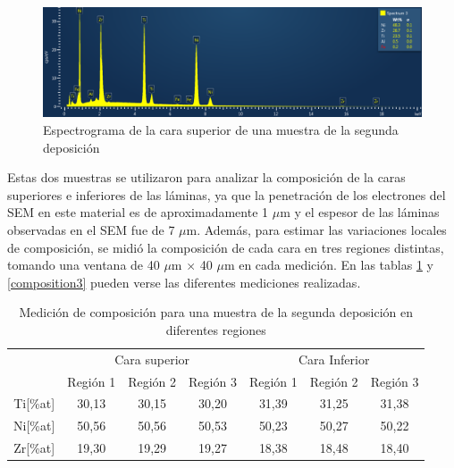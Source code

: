 \documentclass[12pt]{article}
\theoremstyle{definition}
\theoremstyle{remark}
\begin{document}
{ \begin{figure}[H]
 	\centering
	\includegraphics[scale=0.5]{img/dep2.png}
 	\caption{Espectrograma de la cara superior de una muestra de la segunda deposición}
	\label{dep2}
\end{figure} 

Estas dos muestras se utilizaron para analizar la composición de la caras superiores e inferiores de las láminas, ya que la penetración de los electrones del SEM en este material es de aproximadamente 1 $\mu$m y el espesor de las láminas observadas en el SEM fue de 7 $\mu$m. Además, para estimar las variaciones locales de composición, se midió la composición de cada cara en tres regiones distintas, tomando una ventana de 40 $\mu$m $\times$ 40 $\mu$m en cada medición. En las tablas \ref{composition2} y \ref{composition3} pueden verse las diferentes mediciones realizadas.


\begin{table}[H]
\begin{tabular}{c|c|c|c|c|c|c|}
\cline{2-7}
\multicolumn{1}{l|}{} & \multicolumn{3}{c|}{Cara superior} & \multicolumn{3}{c|}{Cara Inferior} \\ \cline{2-7} 
\multicolumn{1}{l|}{} & Región 1 & Región 2 & Región 3 & Región 1 & Región 2 & Región 3 \\ \hline
\multicolumn{1}{|c|}{Ti{[}\%at{]}} & 30,13 & 30,15 & 30,20 & 31,39 & 31,25 & 31,38 \\ \hline
\multicolumn{1}{|c|}{Ni{[}\%at{]}} & 50,56 & 50,56 & 50,53 & 50,23 & 50,27 & 50,22 \\ \hline
\multicolumn{1}{|c|}{Zr{[}\%at{]}} & 19,30 & 19,29 & 19,27 & 18,38 & 18,48 & 18,40 \\ \hline
\end{tabular}
\caption{Medición de composición para una muestra de la segunda deposición en diferentes regiones}
\label{composition2}
\end{table}

}
\end{document}

